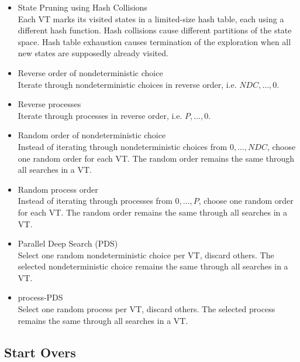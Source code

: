 \documentclass[
fancyheadings, %
%
%
]{stsreprt}
\begin{document}
\begin{itemize}
    \item \textsf{State Pruning using Hash Collisions} \\
          Each VT marks its visited states in a limited-size hash table, each using a different hash function.
          Hash collisions cause different partitions of the state space.
          Hash table exhaustion causes termination of the exploration when all new states are supposedly already visited.
    \item \textsf{Reverse order of nondeterministic choice} \\
          Iterate through nondeterministic choices in reverse order, i.e. $\mathit{NDC}, \dots, 0$.
    \item \textsf{Reverse processes} \\
          Iterate through processes in reverse order, i.e. $P, \dots, 0$.
    \item \textsf{Random order of nondeterministic choice} \\
          Instead of iterating through nondeterministic choices from $0, \dots, \mathit{NDC}$, choose one random order for each VT.
          The random order remains the same through all searches in a VT.
    \item \textsf{Random process order} \\
          Instead of iterating through processes from $0, \dots, P$, choose one random order for each VT.
          The random order remains the same through all searches in a VT.
    \item \textsf{Parallel Deep Search (PDS)} \\
          Select one random nondeterministic choice per VT, discard others.
          The selected nondeterministic choice remains the same through all searches in a VT.
    \item \textsf{process-PDS} \\
          Select one random process per VT, discard others.
          The selected process remains the same through all searches in a VT.
\end{itemize}

\subsection{Start Overs}
\label{section:theory:start-overs}

\end{document}
